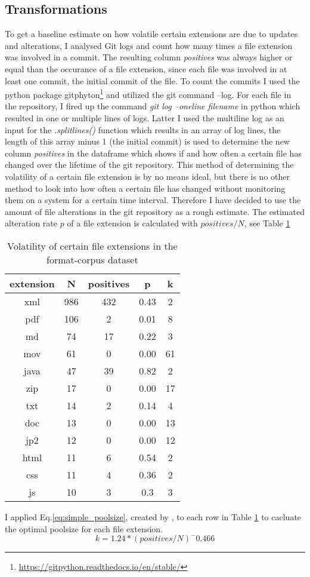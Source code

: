 \subsection{Transformations}
To get a baseline estimate on how volatile certain extensions are due to updates and alterations, I analysed Git logs and count how many times a file extension was involved in a commit. The resulting column \textit{positives} was always higher or equal than the occurance of a file extension, since each file was involved in at least one commit, the initial commit of the file. To count the commits I used the python package gitphyton\footnote{\url{https://gitpython.readthedocs.io/en/stable/}} and utilized the git command --log. For each file in the repository, I fired up the command \textit{git log --oneline filename} in python which resulted in one or multiple lines of logs. Latter I used the multiline log as an input for the \textit{.splitlines()} function which results in an array of log lines, the length of this array minus 1 (the initial commit) is used to determine the new column \textit{positives} in the dataframe which shows if and how often a certain file has changed over the lifetime of the git repository. 
This method of determining the volatility of a certain file extension is by no means ideal, but there is no other method to look into how often a certain file has changed without monitoring them on a system for a certain time interval. Therefore I have decided to use the amount of file alterations in the git repository as a rough estimate.
The estimated alteration rate $p$ of a file extension is calculated with $positives/N$, see Table \ref{tb:git-alterations}
\begin{table}[ht]
    \caption{Volatility of certain file extensions in the format-corpus dataset}
    \centering
    \begin{tabular}{ c c c c c}
    \label{tb:git-alterations}
     extension & N & positives & p & k\\ 
     \hline
     xml & 986 & 432 & 0.43  & 2\\  
     \hline
     pdf &106 &2 &0.01  & 8\\
     \hline
     md & 74 & 17 & 0.22  & 3\\    
     \hline
     mov&61 & 0 & 0.00 &  61\\  
     \hline
     java &47 &39&0.82 & 2 \\  
     \hline
     zip & 17 &0 &0.00 &  17\\
     \hline
     txt & 14 & 2 & 0.14 &  4\\ 
     \hline
     doc & 13 & 0 & 0.00 &  13\\   
     \hline
     jp2 & 12 & 0 & 0.00 &  12\\    
     \hline
     html & 11 & 6 & 0.54 &  2\\   
     \hline
     css & 11 & 4 & 0.36 & 2 \\ 
     \hline
     js & 10 & 3 & 0.3 & 3
    \end{tabular}
\end{table}
I applied Eq.\ref{eq:simple_poolsize}, created by \cite{regen2020simple}, to each row in Table \ref{tb:git-alterations} to cacluate the optimal poolsize for each file extension.
\begin{equation}\label{eq:simple_poolsize}
    k = 1.24* (positives/N)^-0.466
\end{equation}



